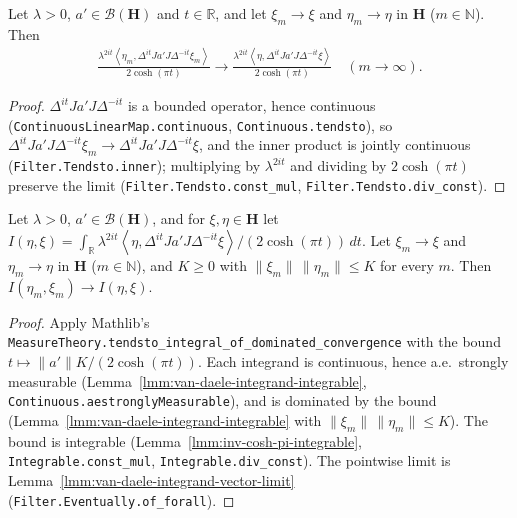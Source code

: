 \begin{lemma}
    \label{lmm:van-daele-integrand-vector-limit}
    \leanok
    Let $\lambda > 0$, $a' \in \mathcal{B}(\mathbf{H})$ and $t \in \mathbb{R}$, and let $\xi_m \to \xi$ and $\eta_m \to \eta$ in $\mathbf{H}$ ($m \in \mathbb{N}$). Then
    \begin{align}
        \frac{\lambda^{2it}\left< \eta_m, \Delta^{it}Ja'J\Delta^{-it}\xi_m \right>}{2\cosh(\pi t)} \to \frac{\lambda^{2it}\left< \eta, \Delta^{it}Ja'J\Delta^{-it}\xi \right>}{2\cosh(\pi t)} \quad (m \to \infty).
    \end{align}
\end{lemma}
\begin{proof}
    \leanok
    $\Delta^{it}Ja'J\Delta^{-it}$ is a bounded operator, hence continuous (\texttt{ContinuousLinearMap.continuous}, \texttt{Continuous.tendsto}), so $\Delta^{it}Ja'J\Delta^{-it}\xi_m \to \Delta^{it}Ja'J\Delta^{-it}\xi$, and the inner product is jointly continuous (\texttt{Filter.Tendsto.inner}); multiplying by $\lambda^{2it}$ and dividing by $2\cosh(\pi t)$ preserve the limit (\texttt{Filter.Tendsto.const\_mul}, \texttt{Filter.Tendsto.div\_const}).
\end{proof}

\begin{lemma}
    \label{lmm:van-daele-integral-continuity}
    \leanok
    Let $\lambda > 0$, $a' \in \mathcal{B}(\mathbf{H})$, and for $\xi, \eta \in \mathbf{H}$ let $I(\eta, \xi) = \int_{\mathbb{R}} \lambda^{2it}\left< \eta, \Delta^{it}Ja'J\Delta^{-it}\xi \right> / (2\cosh(\pi t)) \, dt$. Let $\xi_m \to \xi$ and $\eta_m \to \eta$ in $\mathbf{H}$ ($m \in \mathbb{N}$), and $K \ge 0$ with $\|\xi_m\|\,\|\eta_m\| \le K$ for every $m$. Then $I(\eta_m, \xi_m) \to I(\eta, \xi)$.
\end{lemma}
\begin{proof}
    \leanok
    Apply Mathlib's \texttt{MeasureTheory.tendsto\_integral\_of\_dominated\_convergence} with the bound $t \mapsto \|a'\|K/(2\cosh(\pi t))$. Each integrand is continuous, hence a.e.\ strongly measurable (Lemma~\ref{lmm:van-daele-integrand-integrable}, \texttt{Continuous.aestronglyMeasurable}), and is dominated by the bound (Lemma~\ref{lmm:van-daele-integrand-integrable} with $\|\xi_m\|\,\|\eta_m\| \le K$). The bound is integrable (Lemma~\ref{lmm:inv-cosh-pi-integrable}, \texttt{Integrable.const\_mul}, \texttt{Integrable.div\_const}). The pointwise limit is Lemma~\ref{lmm:van-daele-integrand-vector-limit} (\texttt{Filter.Eventually.of\_forall}).
\end{proof}

